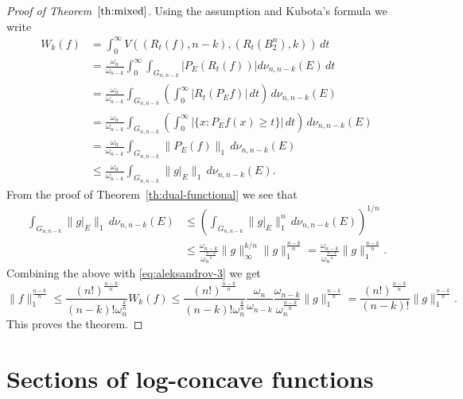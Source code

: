 \documentclass[11pt,leqno]{article}
\theoremstyle{definition}
\theoremstyle{remark}
\numberwithin{equation}{section}
\newcommand{\ls}{\leqslant}
\newcommand{\gr}{\geqslant}
\newcommand{\1}{\textbf{1}}
\begin{document}
\begin{proof}[Proof of Theorem~$\ref{th:mixed}$]Using the assumption and Kubota's formula we write
\begin{align*}W_k(f) &= \int_0^{\infty}V((R_t(f),n-k),(R_t(B_2^n),k))\,dt\\
&=\frac{\omega_n}{\omega_{n-k}}\int_0^{\infty}\int_{G_{n,n-k}}
|P_E(R_t(f))|d\nu_{n,n-k}(E)\,dt\\
&=\frac{\omega_n}{\omega_{n-k}}\int_{G_{n,n-k}}\left(\int_0^{\infty}
|R_t(P_Ef)|\,dt\right)\,d\nu_{n,n-k}(E)\\
&=\frac{\omega_n}{\omega_{n-k}}\int_{G_{n,n-k}}\left(\int_0^{\infty}
|\{x:P_Ef(x)\gr t\}|\,dt\right)\,d\nu_{n,n-k}(E)\\
&=\frac{\omega_n}{\omega_{n-k}}\int_{G_{n,n-k}}\|P_E(f)\|_1\,d\nu_{n,n-k}(E)\\
&\ls \frac{\omega_n}{\omega_{n-k}}\int_{G_{n,n-k}}\|g\big|_E\|_1\,d\nu_{n,n-k}(E).
\end{align*}
From the proof of Theorem~\ref{th:dual-functional} we see that
\begin{align}\label{eq:quermass}
\int_{G_{n,n-k}}\|g\big|_E\|_1\,d\nu_{n,n-k}(E) &\ls \left(\int_{G_{n,n-k}}\|g\big|_E\|_1^n\,d\nu_{n,n-k}(E)\right)^{1/n}\\
\nonumber &\ls \frac{\omega_{n-k}}{\omega_n^{\frac{n-k}{n}}}\|g\|_{\infty}^{k/n}\|g\|_1^{\frac{n-k}{n}}
=\frac{\omega_{n-k}}{\omega_n^{\frac{n-k}{n}}}\|g\|_1^{\frac{n-k}{n}}.
\end{align}
Combining the above with \eqref{eq:aleksandrov-3} we get
\begin{equation*}
\|f\|_1^{\frac{n-k}{n}} \ls \frac{(n!)^{\frac{n-k}{n}}}{(n-k)!\omega_n^{\frac{k}{n}}}W_k(f)\ls \frac{(n!)^{\frac{n-k}{n}}}{(n-k)!\omega_n^{\frac{k}{n}}}\frac{\omega_n}{\omega_{n-k}}
\frac{\omega_{n-k}}{\omega_n^{\frac{n-k}{n}}}\|g\|_1^{\frac{n-k}{n}}=\frac{(n!)^{\frac{n-k}{n}}}{(n-k)!}\|g\|_1^{\frac{n-k}{n}}.
\end{equation*}
This proves the theorem.
\end{proof}



\section{Sections of log-concave functions}\label{section-5}
\end{document}
